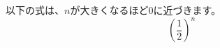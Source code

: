 \documentclass{ltjsarticle}
\begin{document}
以下の式は、$n$が大きくなるほど$0$に近づきます。
\[ ( \frac{1}{2} )^{n} \]
\end{document}
